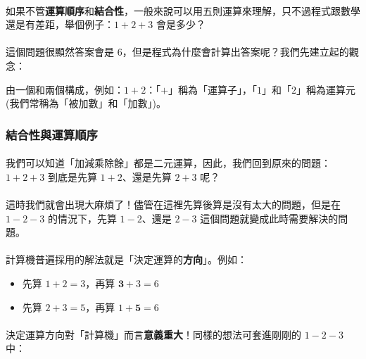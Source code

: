 \documentclass[12pt,a4paper,oneside]{article}
\begin{document}
\begin{CJK}{UTF8}{bkai}
\paragraph{}如果不管\textbf{運算順序}和\textbf{結合性}，一般來說可以用五則運算來理解，只不過程式跟數學還是有差距，舉個例子：$1+2+3$ 會是多少？

\paragraph{}這個問題很顯然答案會是 $6$，但是程式為什麼會計算出答案呢？我們先建立起的觀念：

\begin{mydef}
由一個和兩個構成，例如：$1+2$：「$+$」稱為「運算子」，「$1$」和「$2$」稱為運算元 (我們常稱為「被加數」和「加數」)。
\label{basic:cpp:def:binary:operator}
\end{mydef}

\subsubsection{結合性與運算順序}

\paragraph{}我們可以知道「加減乘除餘」都是二元運算，因此，我們回到原來的問題：$1+2+3$ 到底是先算 $1+2$、還是先算 $2+3$ 呢？

\paragraph{}這時我們就會出現大麻煩了！儘管在這裡先算後算是沒有太大的問題，但是在 $1-2-3$ 的情況下，先算 $1-2$、還是 $2-3$ 這個問題就變成此時需要解決的問題。

\paragraph{}計算機普遍採用的解法就是「決定運算的\textbf{方向}」。例如：
\begin{itemize}
\item 先算 $1+2=3$，再算 $\textbf{3}+3=6$
\item 先算 $2+3=5$，再算 $1+\textbf{5}=6$
\end{itemize}

\paragraph{}決定運算方向對「計算機」而言\textbf{意義重大}！同樣的想法可套進剛剛的 $1-2-3$ 中：


\end{CJK}
\end{document}
